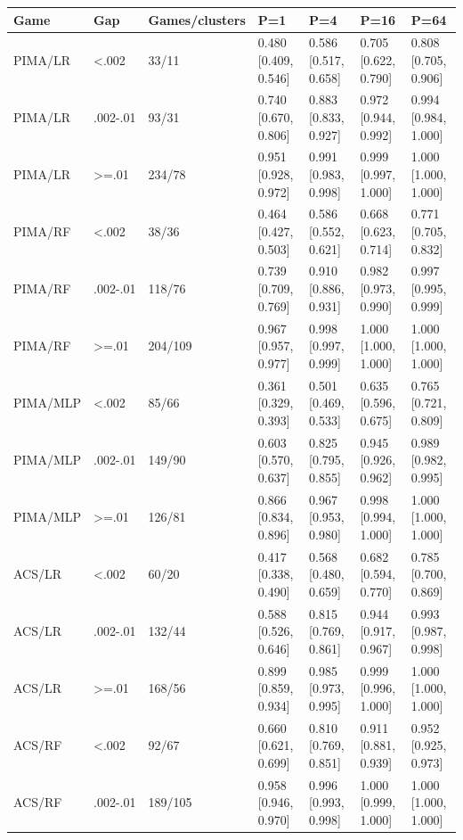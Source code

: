 \begingroup\footnotesize\setlength{\tabcolsep}{3pt}
\begin{tabular}{lllllll}
\toprule
Game & Gap & Games/clusters & P=1 & P=4 & P=16 & P=64 \\
\midrule
PIMA/LR & <.002 & 33/11 & 0.480 [0.409, 0.546] & 0.586 [0.517, 0.658] & 0.705 [0.622, 0.790] & 0.808 [0.705, 0.906] \\
PIMA/LR & .002-.01 & 93/31 & 0.740 [0.670, 0.806] & 0.883 [0.833, 0.927] & 0.972 [0.944, 0.992] & 0.994 [0.984, 1.000] \\
PIMA/LR & >=.01 & 234/78 & 0.951 [0.928, 0.972] & 0.991 [0.983, 0.998] & 0.999 [0.997, 1.000] & 1.000 [1.000, 1.000] \\
PIMA/RF & <.002 & 38/36 & 0.464 [0.427, 0.503] & 0.586 [0.552, 0.621] & 0.668 [0.623, 0.714] & 0.771 [0.705, 0.832] \\
PIMA/RF & .002-.01 & 118/76 & 0.739 [0.709, 0.769] & 0.910 [0.886, 0.931] & 0.982 [0.973, 0.990] & 0.997 [0.995, 0.999] \\
PIMA/RF & >=.01 & 204/109 & 0.967 [0.957, 0.977] & 0.998 [0.997, 0.999] & 1.000 [1.000, 1.000] & 1.000 [1.000, 1.000] \\
PIMA/MLP & <.002 & 85/66 & 0.361 [0.329, 0.393] & 0.501 [0.469, 0.533] & 0.635 [0.596, 0.675] & 0.765 [0.721, 0.809] \\
PIMA/MLP & .002-.01 & 149/90 & 0.603 [0.570, 0.637] & 0.825 [0.795, 0.855] & 0.945 [0.926, 0.962] & 0.989 [0.982, 0.995] \\
PIMA/MLP & >=.01 & 126/81 & 0.866 [0.834, 0.896] & 0.967 [0.953, 0.980] & 0.998 [0.994, 1.000] & 1.000 [1.000, 1.000] \\
ACS/LR & <.002 & 60/20 & 0.417 [0.338, 0.490] & 0.568 [0.480, 0.659] & 0.682 [0.594, 0.770] & 0.785 [0.700, 0.869] \\
ACS/LR & .002-.01 & 132/44 & 0.588 [0.526, 0.646] & 0.815 [0.769, 0.861] & 0.944 [0.917, 0.967] & 0.993 [0.987, 0.998] \\
ACS/LR & >=.01 & 168/56 & 0.899 [0.859, 0.934] & 0.985 [0.973, 0.995] & 0.999 [0.996, 1.000] & 1.000 [1.000, 1.000] \\
ACS/RF & <.002 & 92/67 & 0.660 [0.621, 0.699] & 0.810 [0.769, 0.851] & 0.911 [0.881, 0.939] & 0.952 [0.925, 0.973] \\
ACS/RF & .002-.01 & 189/105 & 0.958 [0.946, 0.970] & 0.996 [0.993, 0.998] & 1.000 [0.999, 1.000] & 1.000 [1.000, 1.000] \\

\end{tabular}
